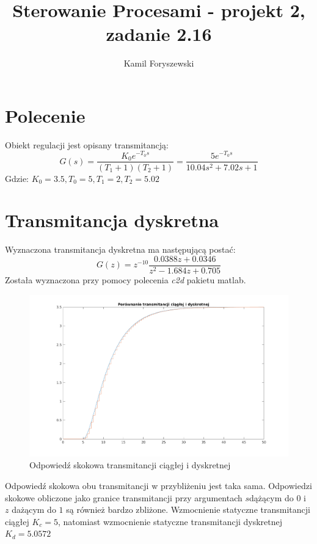 \documentclass[a4paper, 11pt]{article}
\author{Kamil Foryszewski}
\title{Sterowanie Procesami - projekt 2, zadanie 2.16}
\begin{document}

\maketitle
\tableofcontents

\section{Polecenie}
Obiekt regulacji jest opisany transmitancją: 
$$G(s) = \frac{K_0e^{-T_0s}}{(T_1 + 1)(T_2+1)}  = \frac{5e^{-T_0s}}{10.04s^2+7.02s +1}  $$
Gdzie: 
$K_0 = 3.5, T_0 = 5, T_1 = 2, T_2 = 5.02$

\section{Transmitancja dyskretna}
Wyznaczona transmitancja dyskretna ma następującą postać: 
$$G(z) = z^{-10}\frac{0.0388z+0.0346}{z^2-1.684z+0.705}$$
Została wyznaczona przy pomocy polecenia \emph{c2d} pakietu matlab. 
\begin{figure}[htp]
\centering
\includegraphics[scale=0.6]{1_1.png}
\caption{Odpowiedź skokowa transmitancji ciągłej i dyskretnej}
\label{}
\end{figure}%
Odpowiedź skokowa obu transmitancji w przybliżeniu jest taka sama. Odpowiedzi skokowe obliczone jako granice transmitancji przy argumentach $s$dążącym do $0$ i $z$ dażącym do $1$ są również bardzo zbliżone. Wzmocnienie statyczne transmitancji ciągłej $K_c = 5$, natomiast wzmocnienie statyczne transmitancji dyskretnej $K_d = 5.0572$
\label{3}
\end{document}
